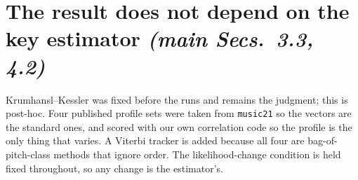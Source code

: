 \documentclass{article}
\begin{document}
\section{The result does not depend on the key estimator \normalfont\textit{(main Secs.~3.3, 4.2)}}
\label{sec:estimators}
%

Krumhansl--Kessler was fixed before the runs and remains the judgment; this is post-hoc.
Four published profile sets were taken from \texttt{music21} so the vectors are the
standard ones, and scored with our own correlation code so the profile is the only thing
that varies. A Viterbi tracker is added because all four are bag-of-pitch-class methods
that ignore order. The likelihood-change condition is held fixed throughout, so any
change is the estimator's.
\end{document}
